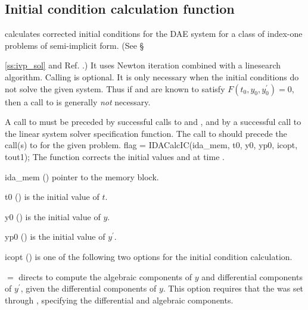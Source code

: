 
\subsection{Initial condition calculation function}\label{ss:idacalcic}

 calculates corrected initial conditions for the DAE 
system for a class of index-one problems of semi-implicit form.
(See \S{\ref{ss:ivp_sol} and Ref. \cite{BHP:98}.)
It uses Newton iteration combined with a linesearch algorithm.
Calling  is optional. It is only necessary when the  
initial conditions do not solve the given system.  Thus if   
 and  are known to satisfy $F(t_0, y_0, y^\prime_0) = 0$, 
then a call to  is generally {\em not} necessary.

A call to  must be preceded by successful calls to  
 and , and by a successful call to the 
linear system solver specification function.  
The call to  should precede the call(s) to   
for the given problem.
%
{
  flag = IDACalcIC(ida\_mem, t0, y0, yp0, icopt, tout1);
}
{
  The function  corrects the initial values  and  at
  time .
}
{
  \begin{args}

  \item[ida\_mem] ()
    pointer to the {\ida} memory block.

  \item[t0] ()
    is the initial value of $t$.

  \item[y0] ()
    is the initial value of $y$. 

  \item[yp0] ()
    is the initial value of $y^\prime$.   

  \item[icopt] ()
    is one of the following two options for the initial condition calculation.
    
    $ = $ directs  to compute 
    the algebraic components of $y$ and differential components of $y^\prime$, 
    given the differential components of $y$.  
    This option requires that the   was set through 
    , specifying the differential and algebraic components.  
    

\end{args}}}
